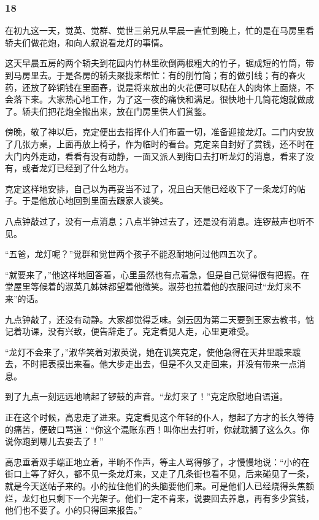 \subsubsection*{18}

\par 在初九这一天，觉英、觉群、觉世三弟兄从早晨一直忙到晚上，忙的是在马房里看轿夫们做花炮，和向人叙说看龙灯的事情。
\par 这天早晨五房的两个轿夫到花园内竹林里砍倒两根粗大的竹子，锯成短的竹筒，带到马房里去。于是各房的轿夫聚拢来帮忙：有的削竹筒；有的做引线；有的舂火药，还放了碎铜钱在里面舂，说是将来放出的火花便可以贴在人的肉体上面烧，不会落下来。大家热心地工作，为了这一夜的痛快和满足。很快地十几筒花炮就做成了。轿夫们把花炮全搬出来，放在门房里供人们赏鉴。
\par 傍晚，敬了神以后，克定便出去指挥仆人们布置一切，准备迎接龙灯。二门内安放了几张方桌，上面再放上椅子，作为临时的看台。克定亲自封好了赏钱，还不时在大门内外走动，看看有没有动静，一面又派人到街口去打听龙灯的消息，看来了没有，或者龙灯已经到了什么地方。
\par 克定这样地安排，自己以为再妥当不过了，况且白天他已经收下了一条龙灯的帖子。于是他放心地回到里面去跟家人谈笑。
\par 八点钟敲过了，没有一点消息；八点半钟过去了，还是没有消息。连锣鼓声也听不见。
\par “五爸，龙灯呢？”觉群和觉世两个孩子不能忍耐地问过他四五次了。
\par “就要来了，”他这样地回答着，心里虽然也有点着急，但是自己觉得很有把握。在堂屋里等候着的淑英几姊妹都望着他微笑。淑芬也拉着他的衣服问过“龙灯来不来”的话。
\par 九点钟敲了，还没有动静。大家都觉得乏味。剑云因为第二天要到王家去教书，惦记着功课，没有兴致，便告辞走了。克定看见人走，心里更难受。
\par “龙灯不会来了，”淑华笑着对淑英说，她在讥笑克定，使他急得在天井里踱来踱去，不时把表摸出来看。他大步走出去，但是不久又走回来，并没有带来一点消息。
\par 到了九点一刻远远地响起了锣鼓的声音。“龙灯来了！”克定欣慰地自语道。
\par 正在这个时候，高忠走了进来。克定看见这个年轻的仆人，想起了方才的长久等待的痛苦，便破口骂道：“你这个混账东西！叫你出去打听，你就耽搁了这么久。你说你跑到哪儿去耍去了！”
\par 高忠垂着双手端正地立着，半晌不作声，等主人骂得够了，才慢慢地说：“小的在街口上等了好久，都不见一条龙灯来，又走了几条街也看不见，后来碰见了一条，就是今天送帖子来的。小的拉住他们的头脑要他们来。可是他们人已经烧得头焦额烂，龙灯也只剩下一个光架子。他们一定不肯来，说要回去养息，再有多少赏钱，他们也不要了。小的只得回来报告。”
